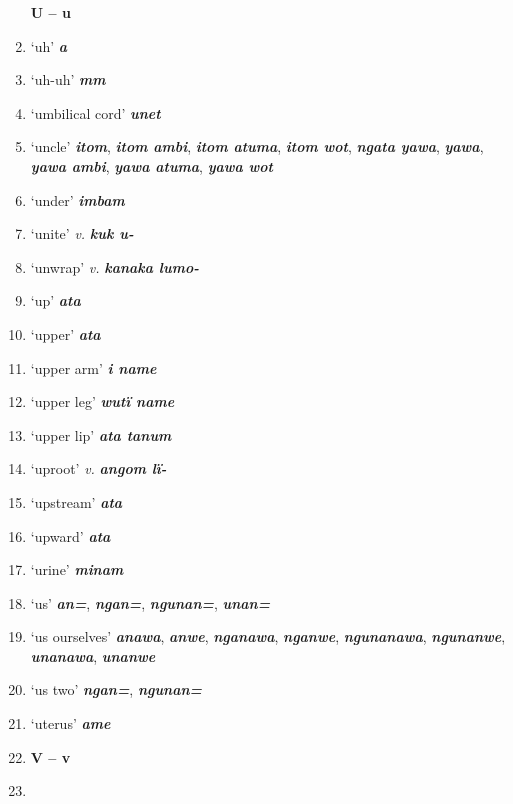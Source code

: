 \begin{enumerate}[noitemsep, label={}, align=left, widest=190, labelsep=1ex,leftmargin=*,itemindent=-10pt]
\noindent \textbf{U – u}\\ \item

‘uh’ \textbf{\textit{a}} \item
‘uh-uh’ \textbf{\textit{mm}} \item
‘umbilical cord’ \textbf{\textit{unet}} \item
‘uncle’ \textbf{\textit{itom}}, \textbf{\textit{itom ambi}}, \textbf{\textit{itom atuma}}, \textbf{\textit{itom wot}}, \textbf{\textit{ngata yawa}}, \textbf{\textit{yawa}}, \textbf{\textit{yawa ambi}}, \textbf{\textit{yawa atuma}}, \textbf{\textit{yawa wot}} \item
‘under’ \textbf{\textit{imbam}} \item
‘unite’ \textit{v.} \textbf{\textit{kuk u-}} \item
‘unwrap’ \textit{v.} \textbf{\textit{kanaka lumo-}} \item
‘up’ \textbf{\textit{ata}} \item
‘upper’ \textbf{\textit{ata}} \item
‘upper arm’ \textbf{\textit{i name}} \item
‘upper leg’ \textbf{\textit{wutï name}} \item
‘upper lip’ \textbf{\textit{ata tanum}} \item
‘uproot’ \textit{v.} \textbf{\textit{angom lï-}} \item
‘upstream’ \textbf{\textit{ata}} \item
‘upward’ \textbf{\textit{ata}} \item
‘urine’ \textbf{\textit{minam}} \item
‘us’ \textbf{\textit{an=}}, \textbf{\textit{ngan=}}, \textbf{\textit{ngunan=}}, \textbf{\textit{unan=}} \item
‘us ourselves’ \textbf{\textit{anawa}}, \textbf{\textit{anwe}}, \textbf{\textit{nganawa}}, \textbf{\textit{nganwe}}, \textbf{\textit{ngunanawa}}, \textbf{\textit{ngunanwe}}, \linebreak \textbf{\textit{unanawa}}, \textbf{\textit{unanwe}} \item
‘us two’ \textbf{\textit{ngan=}}, \textbf{\textit{ngunan=}} \item
‘uterus’ \textbf{\textit{ame}}\\ \item

\noindent \textbf{V – v}\\ \item


\end{enumerate}
